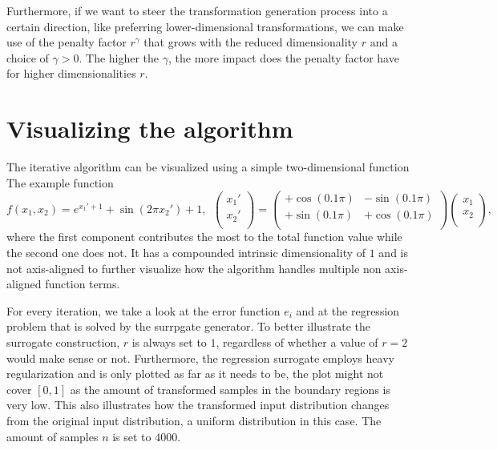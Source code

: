 \documentclass[
  a4paper,  %
  twoside,  %
  bibliography=totoc,
  headsepline,
  cleardoublepage=empty,
  parskip=half,
  draft=false
]{scrbook}
\begin{document}
Furthermore, if we want to steer the transformation generation process into a certain direction, like preferring lower-dimensional transformations, we can make use of the penalty factor $r^\gamma$ that grows with the reduced dimensionality $r$ and a choice of $\gamma > 0$.
The higher the $\gamma$, the more impact does the penalty factor have for higher dimensionalities $r$.

\section{Visualizing the algorithm}

The iterative algorithm can be visualized using a simple two-dimensional function
The example function
\begin{equation}
f(x_1, x_2)=e^{x_1' + 1} + \sin(2 \pi x_2') + 1, ~~ \begin{pmatrix}
    x_1' \\ x_2'
    \\
  \end{pmatrix} = \begin{pmatrix}
    +\cos(0.1 \pi) & -\sin(0.1 \pi)\\
    +\sin(0.1 \pi) & +\cos(0.1 \pi)
    \\
  \end{pmatrix}\begin{pmatrix}
    x_1 \\ x_2
    \\
  \end{pmatrix},
\end{equation}
where the first component contributes the most to the total function value while the second one does not.
It has a compounded intrinsic dimensionality of $1$ and is not axis-aligned to further visualize how the algorithm handles multiple non axis-aligned function terms.

For every iteration, we take a look at the error function $e_i$ and at the regression problem that is solved by the surrpgate generator.
To better illustrate the surrogate construction, $r$ is always set to $1$, regardless of whether a value of $r=2$ would make sense or not.
Furthermore, the regression surrogate employs heavy regularization and is only plotted as far as it needs to be, \ie the plot might not cover $[0,1]$ as the amount of transformed samples in the boundary regions is very low.
This also illustrates how the transformed input distribution changes from the original input distribution, a uniform distribution in this case.
The amount of samples $n$ is set to $4000$.
\end{document}
